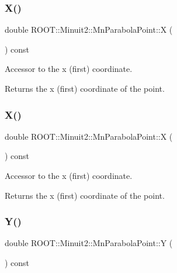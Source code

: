 \subsubsection{\texorpdfstring{X()}{X()}\hspace{0.1cm}{\footnotesize\ttfamily [2/3]}}
{\footnotesize\ttfamily double R\+O\+O\+T\+::\+Minuit2\+::\+Mn\+Parabola\+Point\+::X (\begin{DoxyParamCaption}{ }\end{DoxyParamCaption}) const\hspace{0.3cm}{\ttfamily [inline]}}

Accessor to the x (first) coordinate.

\begin{DoxyReturn}{Returns}
the x (first) coordinate of the point. 
\end{DoxyReturn}
\mbox{\label{classROOT_1_1Minuit2_1_1MnParabolaPoint_afdb080f9186b5fa6966a42394f2a0678}} 
\subsubsection{\texorpdfstring{X()}{X()}\hspace{0.1cm}{\footnotesize\ttfamily [3/3]}}
{\footnotesize\ttfamily double R\+O\+O\+T\+::\+Minuit2\+::\+Mn\+Parabola\+Point\+::X (\begin{DoxyParamCaption}{ }\end{DoxyParamCaption}) const\hspace{0.3cm}{\ttfamily [inline]}}

Accessor to the x (first) coordinate.

\begin{DoxyReturn}{Returns}
the x (first) coordinate of the point. 
\end{DoxyReturn}
\mbox{\label{classROOT_1_1Minuit2_1_1MnParabolaPoint_abc0c0fa35bdee10c52229aadef4e20be}} 
\subsubsection{\texorpdfstring{Y()}{Y()}\hspace{0.1cm}{\footnotesize\ttfamily [1/3]}}
{\footnotesize\ttfamily double R\+O\+O\+T\+::\+Minuit2\+::\+Mn\+Parabola\+Point\+::Y (\begin{DoxyParamCaption}{ }\end{DoxyParamCaption}) const\hspace{0.3cm}{\ttfamily [inline]}}

